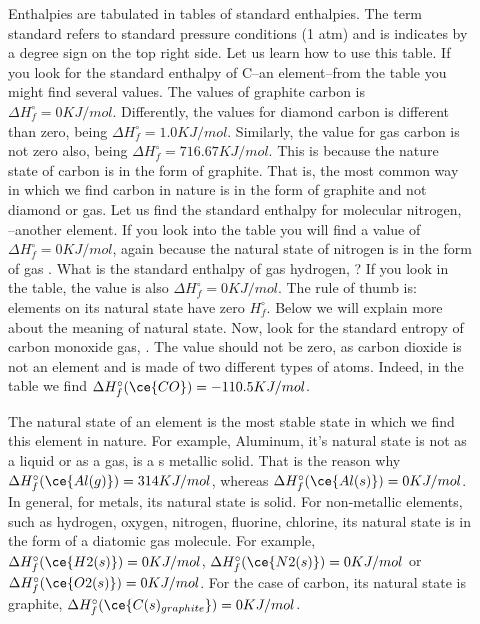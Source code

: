 \documentclass[main.tex]{subfiles}
\begin{document}
\sloppy
\begin{description}

  
  
  
\item[] 
Enthalpies are tabulated in tables of standard enthalpies. The term standard refers to standard pressure conditions (1 atm) and is indicates by a degree sign on the top right side. Let us learn how to use this table. If you look for the standard enthalpy of C--an element--from the table you might find several values. The values of graphite carbon is $\Delta H_f^{\circ}=0KJ/mol$. Differently, the values for diamond carbon is different than zero, being $\Delta H_f^{\circ}=1.0KJ/mol$. Similarly, the value for gas carbon is not zero also, being $\Delta H_f^{\circ}=716.67KJ/mol$. This is because the nature state of carbon is in the form of graphite. That is, the most common way in which we find carbon in nature is in the form of graphite and not diamond or gas. Let us find the standard enthalpy for molecular nitrogen, --another element. If you look into the table you will find a value of $\Delta H_f^{\circ}=0KJ/mol$, again because the natural state of nitrogen is in the form of gas . What is the standard enthalpy of gas hydrogen, ? If you look in the table, the value is also $\Delta H_f^{\circ}=0KJ/mol$. The rule of thumb is: elements on its natural state have zero $H_f^{\circ}$. Below we will explain more about the meaning of natural state.
Now, look for the standard entropy of carbon monoxide gas, . The value should not be zero, as carbon dioxide is not an element and is made of two different types of atoms. Indeed, in the table we find $\Delta H_f^{\circ}(\ce{CO})=-110.5KJ/mol$.
\item[]
The natural state of an element is the most stable state in which we find this element in nature. For example, Aluminum, it's natural state is not as a liquid or as a gas, is a s metallic solid. That is the reason why $\Delta H_f^{\circ}(\ce{Al(g)})=314KJ/mol$, whereas $\Delta H_f^{\circ}(\ce{Al(s)})=0KJ/mol$. In general, for metals, its natural state is solid. For non-metallic elements, such as hydrogen, oxygen, nitrogen, fluorine, chlorine, its natural state is in the form of a diatomic gas molecule. For example, $\Delta H_f^{\circ}(\ce{H2(s)})=0KJ/mol$, $\Delta H_f^{\circ}(\ce{N2(s)})=0KJ/mol$ or $\Delta H_f^{\circ}(\ce{O2(s)})=0KJ/mol$. For the case of carbon, its natural state is graphite, $\Delta H_f^{\circ}(\ce{C(s)_{graphite}})=0KJ/mol$.

\end{description}
\end{document}
